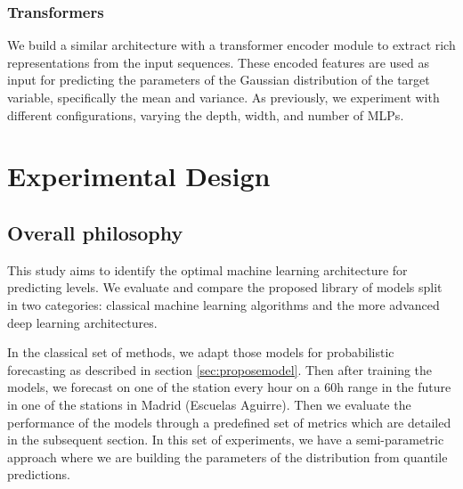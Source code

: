 \documentclass[12pt,a4paper]{book}
\begin{document}
\subsection{Transformers} 
We build a similar architecture with a transformer encoder module to extract rich representations from the input sequences. These encoded features are used as input for predicting the parameters of the Gaussian distribution of the target variable, specifically the mean and variance. As previously, we experiment with different configurations, varying the depth, width, and number of MLPs.

\chapter{Experimental Design}
\section{Overall philosophy}
This study aims to identify the optimal machine learning architecture for predicting \no{} levels. We evaluate and compare the proposed library of models split in two categories: classical machine learning algorithms and the more advanced deep learning architectures.

In the classical set of methods, we adapt those models for probabilistic forecasting as described in section \ref{sec:proposemodel}. Then after training the models, we forecast on one of the station every hour on a 60h range in the future in one of the stations in Madrid (Escuelas Aguirre). Then we evaluate the performance of the models through a predefined set of metrics which are detailed in the subsequent section. In this set of experiments, we have a semi-parametric approach where we are building the parameters of the distribution from quantile predictions.
\end{document}
